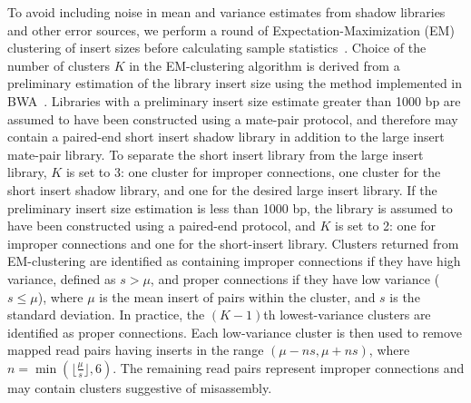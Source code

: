 \documentclass{bioinfo}
\begin{document}
To avoid including noise in mean and variance estimates from shadow libraries and other error sources, 
we perform a round of Expectation-Maximization (EM) clustering of insert sizes before calculating sample statistics~\citep{GuptaChen2010}. 
Choice of the number of clusters $K$ in
the EM-clustering algorithm is derived from a preliminary estimation of the library insert size using the method implemented in
BWA~\citep{bwa}. Libraries with a preliminary
insert size estimate greater than 1000 bp are assumed to have been constructed using a mate-pair protocol, and therefore
may contain a paired-end short insert shadow library in addition to the large insert mate-pair library. To separate the short insert library
from the large insert library, $K$ is set to 3: one cluster for improper connections, one cluster for the short insert
shadow library, and one for the desired large insert library. If the preliminary insert size estimation is less than 1000 bp, the library
is assumed to have been constructed using a paired-end protocol, and $K$ is set to 2: one for improper connections
and one for the short-insert library. Clusters returned from EM-clustering are identified as containing improper connections if 
they have high variance, defined as $s > \mu$, and proper connections if they have low variance ($s \le \mu$), where $\mu$ is the mean insert of pairs within
the cluster, and $s$ is the standard deviation. In practice, the $(K-1)$th lowest-variance clusters are identified as proper connections.
Each low-variance cluster is then used to remove mapped read pairs 
having inserts in the range $(\mu-ns,\mu+ns)$, where $n = \min(\lfloor\frac{\mu}{s}\rfloor, 6)$.  The remaining read
pairs represent improper connections and may contain clusters suggestive of misassembly.
\end{document}
